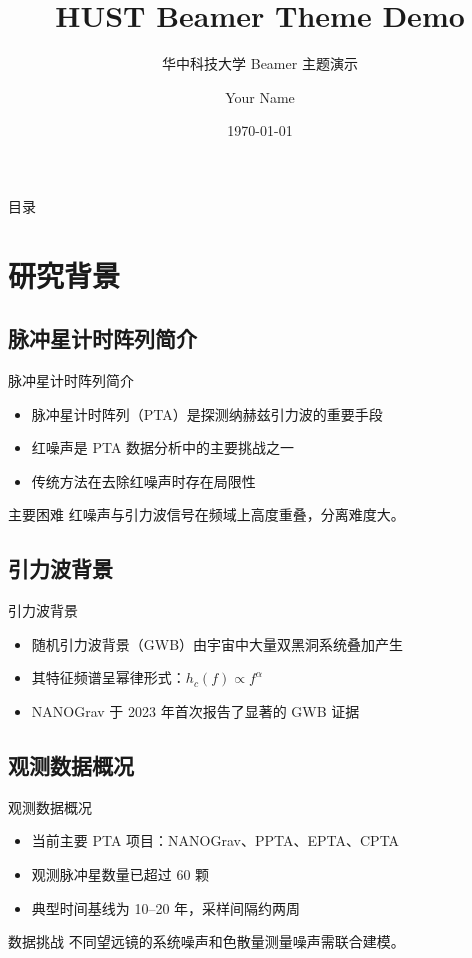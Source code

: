 \documentclass[aspectratio=169]{beamer}
\title{HUST Beamer Theme Demo}
\subtitle{华中科技大学 Beamer 主题演示}
\author{Your Name}
\institute{华中科技大学}
\date{\today}
\begin{document}
\begin{frame}[plain]
  \titlepage
\end{frame}

\begin{frame}{目录}
  \tableofcontents
\end{frame}

\section{研究背景}

\subsection{脉冲星计时阵列简介}
\begin{frame}{脉冲星计时阵列简介}
  \begin{itemize}
    \item 脉冲星计时阵列（PTA）是探测纳赫兹引力波的重要手段
    \item 红噪声是 PTA 数据分析中的主要挑战之一
    \item 传统方法在去除红噪声时存在局限性
  \end{itemize}

  \begin{block}{主要困难}
    红噪声与引力波信号在频域上高度重叠，分离难度大。
  \end{block}
\end{frame}

\subsection{引力波背景}
\begin{frame}{引力波背景}
  \begin{itemize}
    \item 随机引力波背景（GWB）由宇宙中大量双黑洞系统叠加产生
    \item 其特征频谱呈幂律形式：$h_c(f) \propto f^{\alpha}$
    \item NANOGrav 于 2023 年首次报告了显著的 GWB 证据
  \end{itemize}
\end{frame}

\subsection{观测数据概况}
\begin{frame}{观测数据概况}
  \begin{itemize}
    \item 当前主要 PTA 项目：NANOGrav、PPTA、EPTA、CPTA
    \item 观测脉冲星数量已超过 60 颗
    \item 典型时间基线为 10--20 年，采样间隔约两周
  \end{itemize}

  \begin{alertblock}{数据挑战}
    不同望远镜的系统噪声和色散量测量噪声需联合建模。
  \end{alertblock}
\end{frame}
\end{document}
